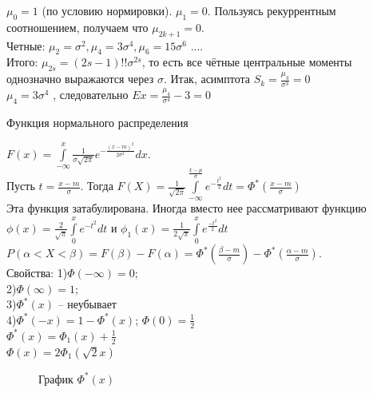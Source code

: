 \documentclass[russian, 12pt, fleqn,x11names]{article}
\begin{document}
$\mu_0 = 1$ (по условию нормировки). $\mu_1 = 0$. Пользуясь рекуррентным соотношением, получаем что $\mu_{2k+1} = 0$.\\
Четные: $\mu_2 = \sigma^2, \mu_4 = 3\sigma^4, \mu_6 = 15\sigma^6$ ....\\
Итого: $\mu_{2s} = (2s-1)!!\sigma^{2s}$, то есть все чётные центральные моменты однозначно выражаются через $\sigma$. Итак, асимптота $S_k = \frac{\mu_3}{\sigma^3} = 0$\\
$\mu_4 = 3\sigma^4$ , следовательно $Ex = \frac{\mu_4}{\sigma^4} - 3 = 0$
\begin{center}
$\textbf{Функция нормального распределения }$\\
\end{center}
$F(x) = \int \limits_{-\infty}^{x}\frac{1}{\sigma\sqrt{2\pi}} e^{-\frac{(x-m)^2}{2\sigma^2}}dx$.\\
Пусть $t = \frac{x-m}{\sigma}$.
Тогда $F(X) = \frac{1}{\sqrt{2\pi}}\int\limits_{-\infty}^{\frac{x-\mu}{\sigma}} e^{-\frac{t^2}{2}} dt =  \Phi^*(\frac{x-m}{\sigma})$\\
Эта функция затабулирована. Иногда вместо нее рассматривают функцию $\phi(x) = \frac{2}{\sqrt{\pi}} \int\limits_{0}^{x}e^{-t^2}dt$ и $\phi_1(x) = \frac{1}{2\sqrt{\pi}} \int\limits_{0}^{x} e^{\frac{-t^2}{2}}dt$\\
$P(\alpha < X < \beta) = F(\beta) - F(\alpha) = \Phi^*(\frac{\beta - m}{\sigma}) - \Phi^*(\frac{\alpha - m}{\sigma}).$\\
Свойства:
1)$\Phi(-\infty) = 0$;\\
2)$\Phi(\infty) = 1$;\\
3)$\Phi^*(x)$ -- неубывает\\
4)$\Phi^*(-x) = 1 - \Phi^*(x)$; $\Phi(0) = \frac{1}{2}$\\
$\Phi^*(x) = \Phi_1(x) + \frac{1}{2}$\\
$\Phi(x) = 2 \Phi_1(\sqrt{2}{x})$
\begin{figure}[!h]
\caption{График $\Phi^*(x)$}
\end{figure}\\
\end{document}
